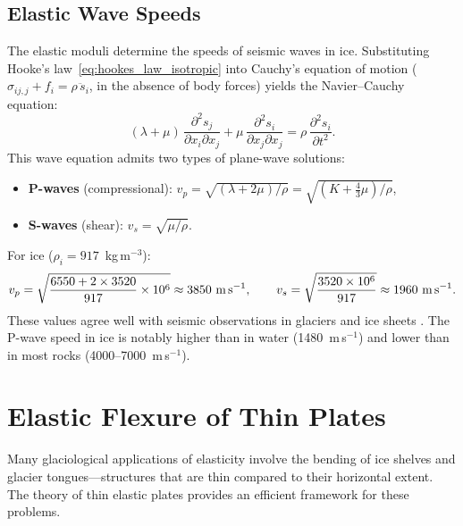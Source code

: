 \documentclass[11pt]{article}
\begin{document}
\subsection{Elastic Wave Speeds}
\label{sec:wave_speeds}

The elastic moduli determine the speeds of seismic waves in ice.  Substituting Hooke's law~\eqref{eq:hookes_law_isotropic} into Cauchy's equation of motion ($\sigma_{ij,j} + f_i = \rho\,\ddot{s}_i$, in the absence of body forces) yields the Navier--Cauchy equation:
\begin{equation}
  (\lambda + \mu)\,\frac{\partial^2 s_j}{\partial x_i \partial x_j} + \mu\,\frac{\partial^2 s_i}{\partial x_j \partial x_j} = \rho\,\frac{\partial^2 s_i}{\partial t^2}.
  \label{eq:navier_cauchy}
\end{equation}
This wave equation admits two types of plane-wave solutions:
\begin{itemize}
  \item \textbf{P-waves} (compressional): $v_p = \sqrt{(\lambda + 2\mu)/\rho} = \sqrt{(K + \frac{4}{3}\mu)/\rho}$,
  \item \textbf{S-waves} (shear): $v_s = \sqrt{\mu/\rho}$.
\end{itemize}
For ice ($\rho_i = 917$~kg\,m$^{-3}$):
\begin{equation}
  v_p = \sqrt{\frac{6550 + 2 \times 3520}{917} \times 10^6} \approx 3850 \text{ m\,s}^{-1}, \qquad v_s = \sqrt{\frac{3520 \times 10^6}{917}} \approx 1960 \text{ m\,s}^{-1}.
  \label{eq:wave_speeds}
\end{equation}
These values agree well with seismic observations in glaciers and ice sheets \cite{KohnenBentley1973}.  The P-wave speed in ice is notably higher than in water (1480~m\,s$^{-1}$) and lower than in most rocks (4000--7000~m\,s$^{-1}$).

\section{Elastic Flexure of Thin Plates}
\label{sec:flexure}

Many glaciological applications of elasticity involve the bending of ice shelves and glacier tongues---structures that are thin compared to their horizontal extent.  The theory of thin elastic plates provides an efficient framework for these problems.
\end{document}
